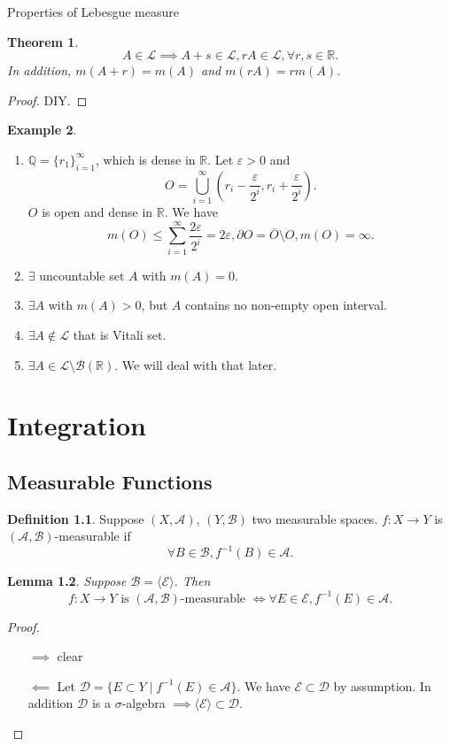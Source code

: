 \documentclass{report}
\newcommand{\R}{\mathbb{R}}
\newcommand{\Q}{\mathbb{Q}}
\newtheorem{theorem}{Theorem}[chapter]
\newtheorem{lemma}[theorem]{Lemma}
\theoremstyle{definition}
\newtheorem{definition}[theorem]{Definition}
\newtheorem{example}[theorem]{Example}
\theoremstyle{remark}
\begin{document}
Properties of Lebesgue measure
\begin{theorem}
	\[A \in \mathcal{L} \implies A + s \in \mathcal{L}, rA \in \mathcal{L}, \forall r, s \in \R.\]
	In addition, $m(A + r) = m(A)$ and $m(rA) = rm(A)$.
\end{theorem}
\begin{proof}
	DIY.
\end{proof}

\begin{example}
	\begin{enumerate}
		\item $\Q = \{r_1\}_{i=1}^\infty$, which is dense in $\R$.
		Let $\varepsilon > 0$ and \[
			O = \bigcup_{i=1}^\infty\left(r_i - \frac{\varepsilon}{2^i}, r_i + \frac{\varepsilon}{2^i}\right).
		\] $O$ is open and dense in $\R$.
		We have
		\[
			m(O) \leq \sum_{i=1}^\infty \frac{2\varepsilon}{2^i} = 2\varepsilon, \partial O = \overline{O} \setminus O, m(O) = \infty.
		\]

		\item $\exists$ uncountable set $A$ with $m(A) = 0$.
		\item $\exists A$ with $m(A) > 0$, but $A$ contains no non-empty open interval.
		\item $\exists A \notin \mathcal{L}$ that is Vitali set.
		\item $\exists A \in \mathcal{L} \setminus \mathcal{B}(\R)$. We will deal with that later.
	\end{enumerate}
\end{example}

\chapter{Integration}
\section{Measurable Functions}
\begin{definition}
	Suppose $(X, \mathcal{A})$, $(Y, \mathcal{B})$ two measurable spaces. 
	$f: X \to Y$ is $(\mathcal{A}, \mathcal{B})$-measurable if 
	\[\forall B \in \mathcal{B}, f^{-1}(B) \in \mathcal{A}.\] 
\end{definition}

\begin{lemma}\label{le:clever}
	Suppose $\mathcal{B} = \langle\mathcal{E}\rangle$. Then \[f: X \to Y \text{ is }(\mathcal{A}, \mathcal{B}) \text{-measurable } \iff \forall E \in \mathcal{E}, f^{-1}(E) \in \mathcal{A}.\]
\end{lemma}
\begin{proof}
	\begin{itemize}
		\item [$\implies$] clear
		\item [$\impliedby$] Let $\mathcal{D} = \{E \subset Y \mid f^{-1}(E) \in \mathcal{A}\}$. We have $\mathcal{E} \subset \mathcal{D}$ by assumption. In addition $\mathcal{D}$ is a $\sigma$-algebra $\implies \langle\mathcal{E}\rangle \subset \mathcal{D}$.\qedhere
	\end{itemize} 
\end{proof}
\end{document}
